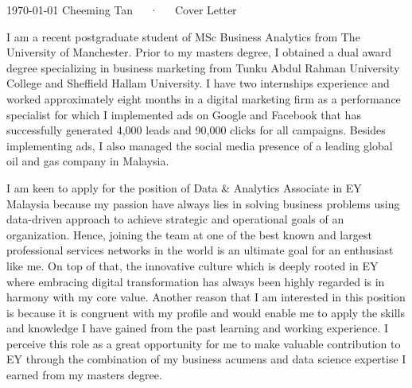 \documentclass[11pt, a4paper]{awesome-cv}
\begin{document}
\makecvheader[R]

\makecvfooter
  {\today}
  {Cheeming Tan~~~·~~~Cover Letter}
  {}

\makelettertitle

\begin{cvletter}

I am a recent postgraduate student of MSc Business Analytics from The University of Manchester. Prior to my masters degree, I obtained a dual award degree specializing in business marketing from Tunku Abdul Rahman University College and Sheffield Hallam University. I have two internships experience and worked approximately eight months in a digital marketing firm as a performance specialist for which I implemented ads on Google and Facebook that has successfully generated 4,000 leads and 90,000 clicks for all campaigns. Besides implementing ads, I also managed the social media presence of a leading global oil and gas company in Malaysia.

I am keen to apply for the position of Data \& Analytics Associate in EY Malaysia because my passion have always lies in solving business problems using data-driven approach to achieve strategic and operational goals of an organization. Hence, joining the team at one of the best known and largest professional services networks in the world is an ultimate goal for an enthusiast like me. On top of that, the innovative culture which is deeply rooted in EY where embracing digital transformation has always been highly regarded is in harmony with my core value. Another reason that I am interested in this position is because it is congruent with my profile and would enable me to apply the skills and knowledge I have gained from the past learning and working experience. I perceive this role as a great opportunity for me to make valuable contribution to EY through the combination of my business acumens and data science expertise I earned from my masters degree.


\end{cvletter}
\end{document}
